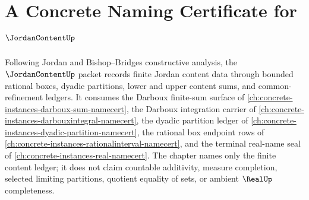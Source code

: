 \chapter{A Concrete Naming Certificate for $\JordanContentUp$}
\label{ch:concrete-instances-jordan-content-namecert}

Following Jordan and Bishop--Bridges constructive analysis, the $\JordanContentUp$ packet records finite Jordan content data through bounded rational boxes, dyadic partitions, lower and upper content sums, and common-refinement ledgers. It consumes the Darboux finite-sum surface of \autoref{ch:concrete-instances-darboux-sum-namecert}, the Darboux integration carrier of \autoref{ch:concrete-instances-darbouxintegral-namecert}, the dyadic partition ledger of \autoref{ch:concrete-instances-dyadic-partition-namecert}, the rational box endpoint rows of \autoref{ch:concrete-instances-rationalinterval-namecert}, and the terminal real-name seal of \autoref{ch:concrete-instances-real-namecert}. The chapter names only the finite content ledger; it does not claim countable additivity, measure completion, selected limiting partitions, quotient equality of sets, or ambient $\RealUp$ completeness.


